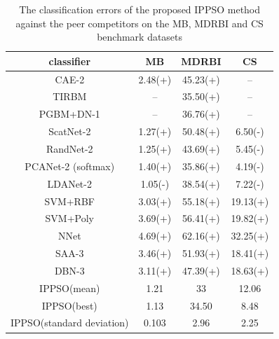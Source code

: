 \documentclass[conference]{IEEEtran}
\begin{document}
\begin{table}[!t]
	\renewcommand{\arraystretch}{1.3}
	\caption{The classification errors of the proposed IPPSO method against the peer competitors on the MB, MDRBI and CS benchmark datasets}
	\label{table:ResultComparison}
	\centering
	\begin{tabular}{|c|c|c|c|}
		\hline
		classiﬁer & MB & MDRBI & CS\\
		\hline
		CAE-2 & 2.48(+) & 45.23(+) & --\\
		\hline
		TIRBM & -- & 35.50(+) & --\\
		\hline
		PGBM+DN-1 & -- & 36.76(+) & --\\
		\hline
		ScatNet-2 & 1.27(+) & 50.48(+) & 6.50(-)\\
		\hline
		RandNet-2 & 1.25(+) & 43.69(+) & 5.45(-)\\
		\hline
		PCANet-2 (softmax)  & 1.40(+) & 35.86(+) & 4.19(-)\\
		\hline
		LDANet-2 & 1.05(-) & 38.54(+) & 7.22(-)\\
		\hline
		SVM+RBF & 3.03(+) & 55.18(+) & 19.13(+)\\
		\hline
		SVM+Poly & 3.69(+) & 56.41(+) & 19.82(+)\\
		\hline
		NNet & 4.69(+) & 62.16(+) & 32.25(+)\\
		\hline
		SAA-3 & 3.46(+) & 51.93(+) & 18.41(+)\\
		\hline
		DBN-3  & 3.11(+) & 47.39(+) & 18.63(+)\\
		\hline
		IPPSO(mean) & 1.21 & 33 & 12.06\\
		\hline
		IPPSO(best) & 1.13 & 34.50 & 8.48\\
		\hline
		IPPSO(standard deviation) & 0.103 & 2.96 & 2.25\\
		\hline
	\end{tabular}
\end{table}

%
\end{document}
